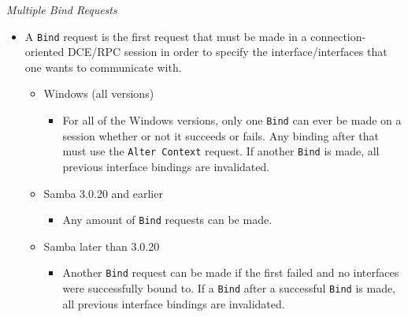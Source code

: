 \documentclass[english]{report}
\begin{document}
\textit{Multiple Bind Requests}
\begin{itemize}

\item[] A \texttt{Bind} request is the first request that must be made in a
connection-oriented DCE/RPC session in order to specify the
interface/interfaces that one wants to communicate with.

\begin{itemize}
\item[] Windows (all versions)
\begin{itemize}

\item[] For all of the Windows versions, only one \texttt{Bind} can ever be
made on a session whether or not it succeeds or fails. Any binding after that
must use the \texttt{Alter Context} request.  If another \texttt{Bind} is made,
all previous interface bindings are invalidated.

\end{itemize}
\item[] Samba 3.0.20 and earlier
\begin{itemize}
\item[] Any amount of \texttt{Bind} requests can be made.
\end{itemize}
\item[] Samba later than 3.0.20
\begin{itemize}

\item[] Another \texttt{Bind} request can be made if the first failed and no
interfaces were successfully bound to. If a \texttt{Bind} after a successful
\texttt{Bind} is made, all previous interface bindings are invalidated.

\end{itemize}
\end{itemize}
\end{itemize}
\end{document}
